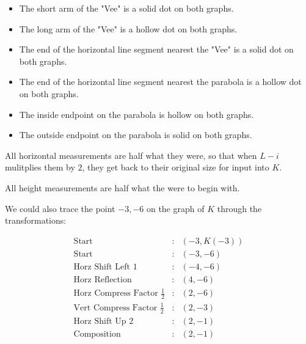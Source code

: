 \documentclass{ximera}
\begin{document}
\begin{itemize}
\item The short arm of the "Vee" is a solid dot on both graphs.
\item The long arm of the "Vee" is a hollow dot on both graphs.
\item The end of the horizontal line segment nearest the "Vee" is a solid dot on both graphs.
\item The end of the horizontal line segment nearest the parabola is a hollow dot on both graphs.
\item The inside endpoint on the parabola is hollow on both graphs.
\item The outside endpoint on the parabola is solid on both graphs.
\end{itemize}










All horizontal measurements are half what they were, so that when $L-i$ mulitplies them by $2$, they get back to their original size for input into $K$.

All height measurements are half what the were to begin with.



We could also trace the point $-3, -6$ on the graph of $K$ through the transformations:




\[
\begin{array}{rcl}

\text{Start} &  : & (-3, K(-3))  \\
\text{Start} & : & (-3, -6) \\
\text{Horz Shift Left $1$} & : & (-4,-6)   \\
\text{Horz Reflection} & : & (4,-6)   \\
\text{Horz Compress Factor $\tfrac{1}{2}$} & : & (2,-6)   \\
\text{Vert Compress Factor $\tfrac{1}{2}$} & : & (2,-3)   \\
\text{Horz Shift Up $2$} & : & (2,-1)   \\
\text{Composition} & : & (2,-1)   
\end{array}
\]
\end{document}
